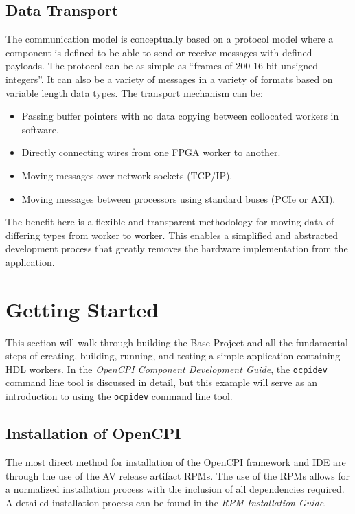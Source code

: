 \subsection{Data Transport}
\label{subsec:Data_Transport}
The communication model is conceptually based on a protocol model where a component is defined to be able to send or receive messages
with defined payloads. The protocol can be as simple as ``frames of 200 16-bit unsigned integers''. It can also be a variety of messages in a variety of formats based on variable length data types. The transport mechanism can be:
\begin{itemize}
\item Passing buffer pointers with no data copying between collocated workers in software.
\item Directly connecting wires from one FPGA worker to another.
\item Moving messages over network sockets (TCP/IP).
\item Moving messages between processors using standard buses (PCIe or AXI).
\end{itemize}

The benefit here is a flexible and transparent methodology for moving data of differing types from worker to worker. This enables a simplified and abstracted development process that greatly removes the hardware implementation from the application.

\newpage
\section{Getting Started}
This section will walk through building the Base Project and all the fundamental steps of creating, building, running, and testing a simple application containing HDL workers. In the \textit{OpenCPI Component Development Guide}, the \verb+ocpidev+ command line tool is discussed in detail, but this example will serve as an introduction to using the \verb+ocpidev+ command line tool.

\subsection{Installation of OpenCPI}
The most direct method for installation of the OpenCPI framework and IDE are through the use of the AV release artifact RPMs. The use of the RPMs allows for a normalized installation process with the inclusion of all dependencies required. A detailed installation process can be found in the \textit{RPM Installation Guide}.

